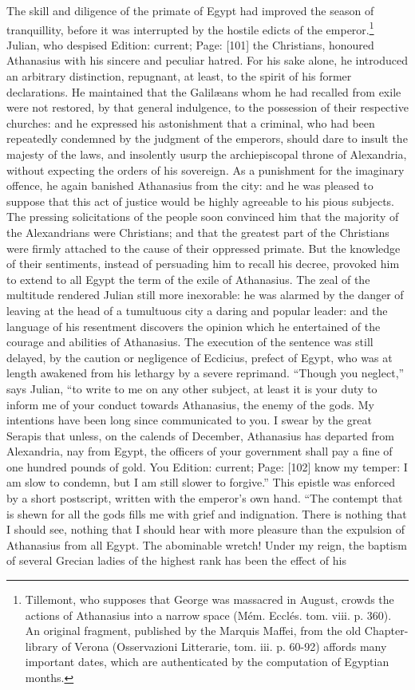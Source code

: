 The skill and diligence of the primate of Egypt had improved the season of tranquillity, before it was interrupted by the hostile edicts of the emperor.\footnote{Tillemont, who supposes that George was massacred in August, crowds the actions of Athanasius into a narrow space (Mém. Ecclés. tom. viii. p. 360). An original fragment, published by the Marquis Maffei, from the old Chapter-library of Verona (Osservazioni Litterarie, tom. iii. p. 60-92) affords many important dates, which are authenticated by the computation of Egyptian months.} Julian, who despised Edition: current; Page: [101] the Christians, honoured Athanasius with his sincere and peculiar hatred. For his sake alone, he introduced an arbitrary distinction, repugnant, at least, to the spirit of his former declarations. He maintained that the Galilæans whom he had recalled from exile were not restored, by that general indulgence, to the possession of their respective churches: and he expressed his astonishment that a criminal, who had been repeatedly condemned by the judgment of the emperors, should dare to insult the majesty of the laws, and insolently usurp the archiepiscopal throne of Alexandria, without expecting the orders of his sovereign. As a punishment for the imaginary offence, he again banished Athanasius from the city: and he was pleased to suppose that this act of justice would be highly agreeable to his pious subjects. The pressing solicitations of the people soon convinced him that the majority of the Alexandrians were Christians; and that the greatest part of the Christians were firmly attached to the cause of their oppressed primate. But the knowledge of their sentiments, instead of persuading him to recall his decree, provoked him to extend to all Egypt the term of the exile of Athanasius. The zeal of the multitude rendered Julian still more inexorable: he was alarmed by the danger of leaving at the head of a tumultuous city a daring and popular leader: and the language of his resentment discovers the opinion which he entertained of the courage and abilities of Athanasius. The execution of the sentence was still delayed, by the caution or negligence of Ecdicius, prefect of Egypt, who was at length awakened from his lethargy by a severe reprimand. \texthebrew{“}Though you neglect,\texthebrew{}” says Julian, \texthebrew{“}to write to me on any other subject, at least it is your duty to inform me of your conduct towards Athanasius, the enemy of the gods. My intentions have been long since communicated to you. I swear by the great Serapis that unless, on the calends of December, Athanasius has departed from Alexandria, nay from Egypt, the officers of your government shall pay a fine of one hundred pounds of gold. You Edition: current; Page: [102] know my temper: I am slow to condemn, but I am still slower to forgive.\texthebrew{}” This epistle was enforced by a short postscript, written with the emperor\texthebrew{}’s own hand. \texthebrew{“}The contempt that is shewn for all the gods fills me with grief and indignation. There is nothing that I should see, nothing that I should hear with more pleasure than the expulsion of Athanasius from all Egypt. The abominable wretch! Under my reign, the baptism of several Grecian ladies of the highest rank has been the effect of his 